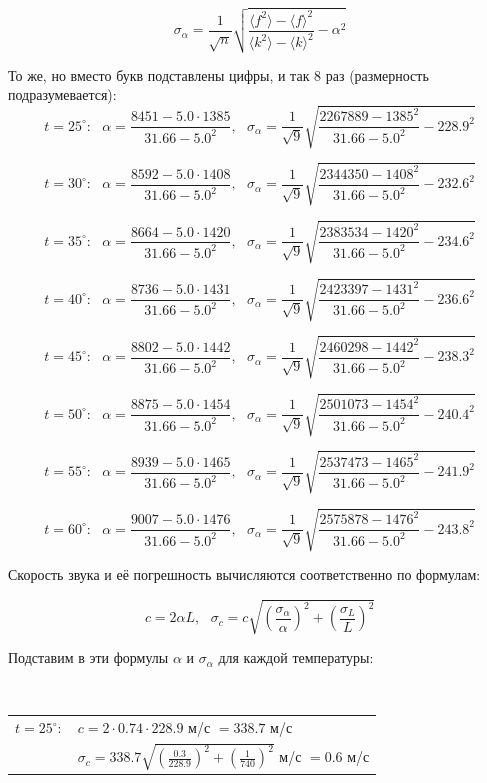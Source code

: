 \documentclass[12pt]{article}
\begin{document}
$$\sigma_\alpha = \frac{1}{\sqrt{n}} \sqrt{\frac{\langle f^2 \rangle - \langle f \rangle ^2}{\langle k^2 \rangle - \langle k \rangle ^2} - \alpha^2}$$

То же, но вместо букв подставлены цифры, и так 8 раз (размерность подразумевается):
$$t = 25^\circ:~~~\alpha = \frac{ 8451  -  5.0 \cdot 1385 }{ 31.66  -  5.0  ^2},~~~\sigma_\alpha = \frac{1}{\sqrt{9}} \sqrt{\frac{ 2267889  -  1385  ^2}{ 31.66  -  5.0  ^2} - 228.9^2}$$

$$t = 30^\circ:~~~\alpha = \frac{ 8592  -  5.0 \cdot 1408 }{ 31.66  -  5.0  ^2},~~~\sigma_\alpha = \frac{1}{\sqrt{9}} \sqrt{\frac{ 2344350  -  1408  ^2}{ 31.66  -  5.0  ^2} - 232.6^2}$$

$$t = 35^\circ:~~~\alpha = \frac{ 8664  -  5.0 \cdot 1420 }{ 31.66  -  5.0  ^2},~~~\sigma_\alpha = \frac{1}{\sqrt{9}} \sqrt{\frac{ 2383534  -  1420  ^2}{ 31.66  -  5.0  ^2} - 234.6^2}$$

$$t = 40^\circ:~~~\alpha = \frac{ 8736  -  5.0 \cdot 1431 }{ 31.66  -  5.0  ^2},~~~\sigma_\alpha = \frac{1}{\sqrt{9}} \sqrt{\frac{ 2423397  -  1431  ^2}{ 31.66  -  5.0  ^2} - 236.6^2}$$

$$t = 45^\circ:~~~\alpha = \frac{ 8802  -  5.0 \cdot 1442 }{ 31.66  -  5.0  ^2},~~~\sigma_\alpha = \frac{1}{\sqrt{9}} \sqrt{\frac{ 2460298  -  1442  ^2}{ 31.66  -  5.0  ^2} - 238.3^2}$$

$$t = 50^\circ:~~~\alpha = \frac{ 8875  -  5.0 \cdot 1454 }{ 31.66  -  5.0  ^2},~~~\sigma_\alpha = \frac{1}{\sqrt{9}} \sqrt{\frac{ 2501073  -  1454  ^2}{ 31.66  -  5.0  ^2} - 240.4^2}$$

$$t = 55^\circ:~~~\alpha = \frac{ 8939  -  5.0 \cdot 1465 }{ 31.66  -  5.0  ^2},~~~\sigma_\alpha = \frac{1}{\sqrt{9}} \sqrt{\frac{ 2537473  -  1465  ^2}{ 31.66  -  5.0  ^2} - 241.9^2}$$

$$t = 60^\circ:~~~\alpha = \frac{ 9007  -  5.0 \cdot 1476 }{ 31.66  -  5.0  ^2},~~~\sigma_\alpha = \frac{1}{\sqrt{9}} \sqrt{\frac{ 2575878  -  1476  ^2}{ 31.66  -  5.0  ^2} - 243.8^2}$$

Скорость звука и её погрешность вычисляются соответственно по формулам:

$$c = 2\alpha L,~~~\sigma_c = c \sqrt{(\frac{\sigma_\alpha}{\alpha})^2 + (\frac{\sigma_L}{L})^2}$$

Подставим в эти формулы $\alpha$ и $\sigma_\alpha$ для каждой температуры:

~

\noindent\begin{tabular}{l@{~~~}l}
$t = 25^\circ:$ & $c = 2 \cdot 0.74 \cdot 228.9$ м/с $=338.7$ м/с \\
~ & $\sigma_c = 338.7 \sqrt{(\frac{0.3}{228.9})^2 + (\frac{1}{740})^2}$ м/с $ = 0.6$ м/с \\
\end{tabular}
\end{document}
